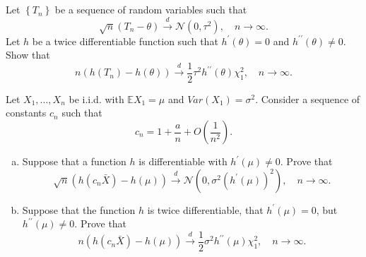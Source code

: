 \chapter{}


\begin{ex}
    Let \(\left\{T_{n}\right\}\) be a sequence of random variables such that
    \[
        \sqrt{n}\left(T_{n}-\theta\right) \stackrel{d}{\rightarrow} \mathcal{N}\left(0, \tau^{2}\right), \quad n \rightarrow \infty. 
    \]
    Let \(h\) be a twice differentiable function such that \(h^{\prime}(\theta)=0\) and \(h^{\prime \prime}(\theta) \neq 0\). Show that
    \[
        n\left(h\left(T_{n}\right)-h(\theta)\right) \stackrel{d}{\rightarrow} \frac{1}{2} \tau^{2} h^{\prime \prime}(\theta) \chi_{1}^{2}, \quad n \rightarrow \infty. 
    \]
\end{ex}

\begin{ex}
    Let \(X_{1}, \ldots, X_{n}\) be i.i.d. with \(\mathbb{E} X_{1}=\mu\) and \(Var\left(X_{1}\right)=\sigma^{2}\). Consider a sequence of constants \(c_{n}\) such that
    \[
        c_{n}=1+\frac{a}{n}+O\left(\frac{1}{n^{2}}\right) .
    \]
    \begin{enumerate}[(a)]
        \item Suppose that a function \(h\) is differentiable with \(h^{\prime}(\mu) \neq 0\). Prove that
        \[
            \sqrt{n}\left(h\left(c_{n} \bar{X}\right)-h(\mu)\right) \stackrel{d}{\rightarrow} \mathcal{N}\left(0, \sigma^{2}\left(h^{\prime}(\mu)\right)^{2}\right), \quad n \rightarrow \infty. 
        \]
        \item Suppose that the function \(h\) is twice differentiable, that \(h^{\prime}(\mu)=0\), but \(h^{\prime \prime}(\mu) \neq 0\). Prove that
        \[
            n\left(h\left(c_{n} \bar{X}\right)-h(\mu)\right) \stackrel{d}{\rightarrow} \frac{1}{2} \sigma^{2} h^{\prime \prime}(\mu) \chi_{1}^{2}, \quad n \rightarrow \infty. 
        \]
    \end{enumerate}
\end{ex}


